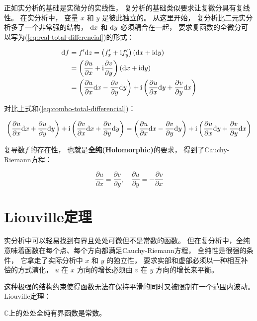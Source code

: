 \documentclass[10pt, openany]{book}
\begin{document}
正如实分析的基础是实微分的实线性，
复分析的基础类似要求让复微分具有复线性。
在实分析中，
变量 $x$ 和 $y$ 是彼此独立的。
从这里开始，
复分析比二元实分析多了一个非常强的结构，
$\text d x$ 和 $\text d y$ 必须耦合在一起，
要求复函数的全微分可以写为(\ref{eq:real-total-differencial})的形式：

$$
\begin{aligned}
\text d f &= f^\prime \text d z
= \left(f^\prime_x + \text i f^\prime_y\right)(\text d x + \text i \text d y) \\
&= \left( \dfrac{\partial u}{\partial x} + \text i \dfrac{\partial v}{\partial y} \right)(\text d x + \text i \text d y) \\
&= \left( \dfrac{\partial u}{\partial x} \text d x - \frac{\partial v}{\partial y} \text d y \right) 
+ \text i \left( \dfrac{\partial u}{\partial x} \text d y + \frac{\partial v}{\partial y} \text d x \right)
\end{aligned}
$$

对比上式和(\ref{eq:combo-total-differencial})：

$$
\left( \dfrac{\partial u}{\partial x} \text d x
+ \dfrac{\partial u}{\partial y}  \text d y \right)
+ \text i \left( \dfrac{\partial v}{\partial x} \text d x
+ \dfrac{\partial v}{\partial y}  \text d y \right)
= \left( \dfrac{\partial u}{\partial x} \text d x - \frac{\partial v}{\partial y} \text d y \right) 
+ \text i \left( \dfrac{\partial u}{\partial x} \text d y + \frac{\partial v}{\partial y} \text d x \right)
$$

复导数$f^\prime$的存在性，
也就是\textbf{全纯(Holomorphic)}的要求，
得到了Cauchy-Riemann方程：

$$
\dfrac{\partial u}{\partial x} = \dfrac{\partial v}{\partial y}, \quad
\dfrac{\partial u}{\partial y} = -\dfrac{\partial v}{\partial x}
$$


\section{Liouville定理}

实分析中可以轻易找到有界且处处可微但不是常数的函数。
但在复分析中，全纯意味着函数在每个点、每个方向都满足Cauchy-Riemann方程，
全纯性是很强的条件，
它拿走了实际分析中 $x$ 和 $y$ 的独立性，
要求实部和虚部必须以一种相互补偿的方式演化，
$u$ 在 $x$ 方向的增长必须由 $v$ 在 $y$ 方向的增长来平衡。

这种极强的结构约束使得函数无法在保持平滑的同时又被限制在一个范围内波动。
Liouville定理：

$\mathbb C$上的处处全纯有界函数是常数。
\end{document}
